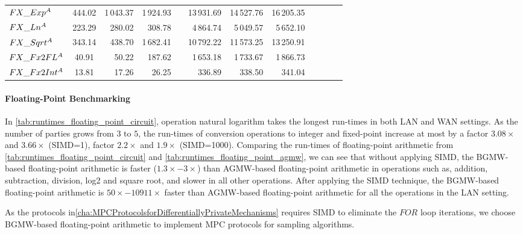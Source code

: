 \begin{table}
{\begin{tabular}{ l c r r r r r r r r r r}
            $FX\_Exp^{A}$                         & 444.02                  & 1\,043.37 & 1\,924.93               &   & 13\,931.69 & 14\,527.76 & 16\,205.35 \\
            $FX\_Ln^{A}$                          & 223.29                  & 280.02    & 308.78                  &   & 4\,864.74  & 5\,049.57  & 5\,652.10  \\
            $FX\_Sqrt^{A}$                        & 343.14                  & 438.70    & 1\,682.41               &   & 10\,792.22 & 11\,573.25 & 13\,250.91 \\
            $FX\_Fx2FL^{A}$                       & 40.91                   & 50.22     & 187.62                  &   & 1\,653.18  & 1\,733.67  & 1\,866.73  \\
            $FX\_Fx2Int^{A}$                      & 13.81                   & 17.26     & 26.25                   &   & 336.89     & 338.50     & 341.04     \\
            \bottomrule
        \end{tabular}
    }
\end{table}
\FloatBarrier

\paragraph{Floating-Point Benchmarking}
\label{para:Floating-PointBenchmarking}


In \autoref{tab:runtimes_floating_point_circuit}, operation natural logarithm takes the longest run-times in both LAN and WAN settings. As the number of parties grows from $3$ to $5$, the run-times of conversion operations to integer and fixed-point increase at most by a factor $3.08\times$ and $3.66\times$ (SIMD=1), factor $2.2\times$ and $1.9\times$ (SIMD=1000).
Comparing the run-times of floating-point arithmetic from \autoref{tab:runtimes_floating_point_circuit} and \autoref{tab:runtimes_floating_point_agmw}, we can see that without applying SIMD, the BGMW-based floating-point arithmetic is faster ($1.3\times-3\times$) than AGMW-based floating-point arithmetic in operations such as, addition, subtraction, division, log2 and square root, and slower in all other operations. After applying the SIMD technique, the BGMW-based floating-point arithmetic is $50\times-10911\times$ faster than AGMW-based floating-point arithmetic for all the operations in the LAN setting.

As the protocols in\autoref{cha:MPCProtocolsforDifferentiallyPrivateMechanisms} requires SIMD to eliminate the $FOR$ loop iterations, we choose BGMW-based floating-point arithmetic to implement MPC protocols for sampling algorithms.


